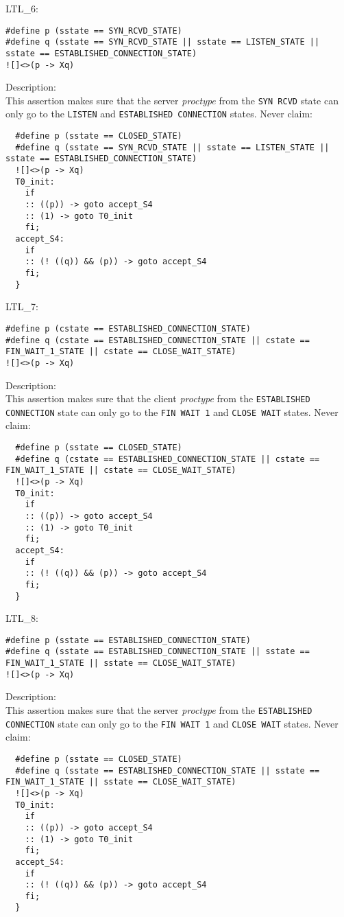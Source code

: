 \documentclass{WigReport}
\begin{document}
LTL\_6:\\
\begin{verbatim}
#define p (sstate == SYN_RCVD_STATE)
#define q (sstate == SYN_RCVD_STATE || sstate == LISTEN_STATE || sstate == ESTABLISHED_CONNECTION_STATE)
![]<>(p -> Xq)
\end{verbatim}
Description:\\
This assertion makes sure that the server \textit{proctype} from the \verb|SYN RCVD| state can only go to the \verb|LISTEN| and \verb|ESTABLISHED CONNECTION| states.
Never claim:\\
\begin{verbatim}
  #define p (sstate == CLOSED_STATE)
  #define q (sstate == SYN_RCVD_STATE || sstate == LISTEN_STATE || sstate == ESTABLISHED_CONNECTION_STATE)
  ![]<>(p -> Xq)
  T0_init:
    if
    :: ((p)) -> goto accept_S4
    :: (1) -> goto T0_init
    fi;
  accept_S4:
    if
    :: (! ((q)) && (p)) -> goto accept_S4
    fi;
  }
\end{verbatim}


LTL\_7:\\
\begin{verbatim}
#define p (cstate == ESTABLISHED_CONNECTION_STATE)
#define q (cstate == ESTABLISHED_CONNECTION_STATE || cstate == FIN_WAIT_1_STATE || cstate == CLOSE_WAIT_STATE)
![]<>(p -> Xq)
\end{verbatim}
Description:\\
This assertion makes sure that the client \textit{proctype} from the \verb|ESTABLISHED CONNECTION| state can only go to the \verb|FIN WAIT 1| and \verb|CLOSE WAIT| states.
Never claim:\\
\begin{verbatim}
  #define p (sstate == CLOSED_STATE)
  #define q (cstate == ESTABLISHED_CONNECTION_STATE || cstate == FIN_WAIT_1_STATE || cstate == CLOSE_WAIT_STATE)
  ![]<>(p -> Xq)
  T0_init:
    if
    :: ((p)) -> goto accept_S4
    :: (1) -> goto T0_init
    fi;
  accept_S4:
    if
    :: (! ((q)) && (p)) -> goto accept_S4
    fi;
  }
\end{verbatim}


LTL\_8:\\
\begin{verbatim}
#define p (sstate == ESTABLISHED_CONNECTION_STATE)
#define q (sstate == ESTABLISHED_CONNECTION_STATE || sstate == FIN_WAIT_1_STATE || sstate == CLOSE_WAIT_STATE)
![]<>(p -> Xq)
\end{verbatim}
Description:\\
This assertion makes sure that the server \textit{proctype} from the \verb|ESTABLISHED CONNECTION| state can only go to the \verb|FIN WAIT 1| and \verb|CLOSE WAIT| states.
Never claim:\\
\begin{verbatim}
  #define p (sstate == CLOSED_STATE)
  #define q (sstate == ESTABLISHED_CONNECTION_STATE || sstate == FIN_WAIT_1_STATE || sstate == CLOSE_WAIT_STATE)
  ![]<>(p -> Xq)
  T0_init:
    if
    :: ((p)) -> goto accept_S4
    :: (1) -> goto T0_init
    fi;
  accept_S4:
    if
    :: (! ((q)) && (p)) -> goto accept_S4
    fi;
  }
\end{verbatim}
\end{document}
